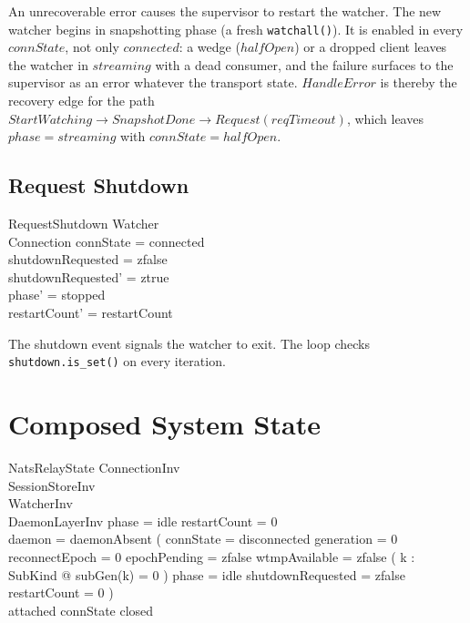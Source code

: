 \documentclass[a4paper,10pt,fleqn]{article}
\begin{document}
An unrecoverable error causes the supervisor to restart the
watcher.  The new watcher begins in snapshotting phase
(a fresh \texttt{watchall()}).  It is enabled in every $connState$,
not only $connected$: a wedge ($halfOpen$) or a dropped client leaves
the watcher in $streaming$ with a dead consumer, and the failure
surfaces to the supervisor as an error whatever the transport state.
$HandleError$ is thereby the recovery edge for the path
$StartWatching \to SnapshotDone \to Request(reqTimeout)$, which
leaves $phase = streaming$ with $connState = halfOpen$.

\subsection{Request Shutdown}

\begin{schema}{RequestShutdown}
  \Delta Watcher \\
  \Xi Connection
  \where
  connState = connected \\
  shutdownRequested = zfalse \\
  shutdownRequested' = ztrue \\
  phase' = stopped \\
  restartCount' = restartCount
\end{schema}

The shutdown event signals the watcher to exit.  The loop
checks \texttt{shutdown.is\_set()} on every iteration.

\section{Composed System State}
\label{sec:composed}

\begin{schema}{NatsRelayState}
  ConnectionInv \\
  SessionStoreInv \\
  WatcherInv \\
  DaemonLayerInv
  \where
  phase = idle \implies restartCount = 0 \\
  daemon = daemonAbsent \implies
    ( connState = disconnected \land generation = 0 \land
      reconnectEpoch = 0 \land epochPending = zfalse \land
      wtmpAvailable = zfalse \land
      ( \forall k : SubKind @ subGen(k) = 0 ) \land
      phase = idle \land shutdownRequested = zfalse \land
      restartCount = 0 ) \\
  attached \neq \emptyset \implies connState \neq closed
\end{schema}
\end{document}
